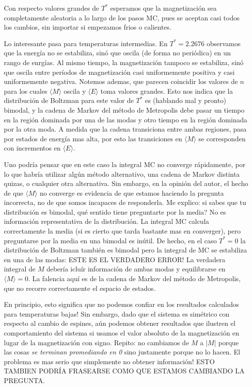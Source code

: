 \documentclass[a4paper,12pt]{article}
\begin{document}
Con respecto valores grandes de $T^*$ esperamos que la magnetización sea completamente aleatoria a lo largo de los pasos MC, pues se aceptan casi todos los cambios, sin importar si empezamos frios o calientes.

Lo interesante pasa para temperaturas intermedias. En $T^* = 2.2676$ observamos que la energía no se estabiliza, sinó que oscila (de forma no periódica) en un rango de enrgías. Al mismo tiempo, la magnetización tampoco se estabiliza, sinó que oscila entre períodos de magnetización casi uniformemente positiva y casi uniformemente negativa. Notemos ademas, que parecen coincidir los valores de $n$ para los cuales $\langle M \rangle$ oscila y $\langle E \rangle$ toma valores grandes. Esto nos indica que la distribución de Boltzman para este valor de $T^*$ es (hablando mal y pronto) bimodal, y la cadena de Markov del método de Metropolis debe pasar un tiempo en la región dominada por una de las modas y otro tiempo en la región dominada por la otra moda. A medida que la cadena transiciona entre ambas regiones, pasa por estados de energía mas alta, por esto las transiciones en $\langle M \rangle$ se corresponden con incrementos en $\langle E \rangle$.

Uno podría pensar que en este caso la integral MC no converge rápidamente, por lo que habría utilizar algún método alternativo, una cadena de Markov distinta quizas, o cualquier otra alternativa. Sin embargo, en la opinión del autor, el hecho de que $\langle M \rangle$ no converge es evidencia de que estamos haciendo la pregunta incorrecta, no de que somos incapaces de responderla. Me explico: si sabes que tu distribución es bimodal, qué sentido tiene preguntarte por la media? No es información representativa de la distribución. La integral MC calcula correctamente la media (si es cierto que tarda bastante mas en converger), pero preguntarse por la media en una bimodal es inútil. De hecho, en el caso $T^* = 0$ la distribución de Boltzman también es bimodal pero la integral de MC se estabiliza en una de las modas: ESTE ES EL VERDADERO ERROR! La verdadera integral de $M$ debería icluír información de ambas modas y equilibrarse en $\langle M \rangle = 0$. La falencia aquí es de la cadena de Markov del método de Metropolis, que no recorre correctamente el espacio de estados.

En principio, esto significa que no podemos confiar en los resultados calculados para temperaturas bajas! Sin embargo, dado que el sistema es simétrico con respecto al cambio de espines, aún podemos obtener resultados que ilustren el comportamiento del sistema si usamos el valor absoluto de la magnetización en lugar de la magnetización con signo. Repito: no cambiamos de $M$ a $|M|$ porque las cosas {\it se terminan promediando en 0} sino justamente porque no lo hacen. El problema es mas serio que simplemente no obtener información! ESTO TAMBIEN PODRÍA FRASEARSE COMO QUE ESTAMOS CAMBIANDO LA PREGUNTA.\\
\end{document}
